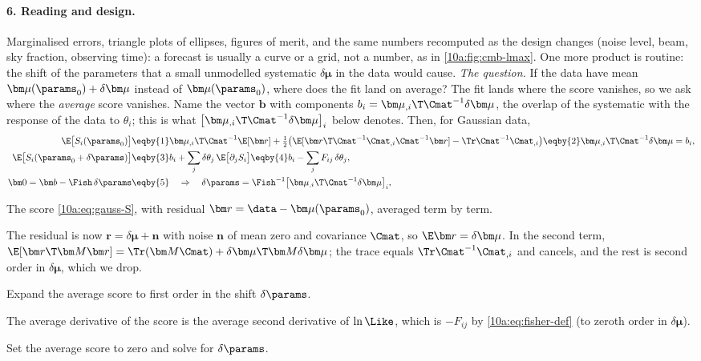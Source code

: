 \paragraph{6. Reading and design.} Marginalised errors, triangle plots of ellipses, figures of merit, and the
same numbers recomputed as the design changes (noise level, beam, sky fraction, observing time): a forecast is
usually a curve or a grid, not a number, as in \cref{10a:fig:cmb-lmax}. One more product is routine: the shift of
the parameters that a small unmodelled systematic $\delta\bm\mu$ in the data would cause. \emph{The question.} If the data
have mean $\bm\mu(\params_0)+\delta\bm\mu$ instead of $\bm\mu(\params_0)$, where does the fit land on average? The fit lands
where the score vanishes, so we ask where the \emph{average} score vanishes. Name the vector $\bm b$ with components
$b_i=\bm\mu_{,i}\T\Cmat^{-1}\delta\bm\mu$, the overlap of the systematic with the response of the data to $\theta_i$; this is
what $\bigl[\bm\mu_{,i}\T\Cmat^{-1}\delta\bm\mu\bigr]_i$ below denotes. Then, for Gaussian data,
\begin{align}
  \E\bigl[S_i(\params_0)\bigr]
  &\eqby{1}\bm\mu_{,i}\T\Cmat^{-1}\E[\bm r]
   +\tfrac12\bigl(\E[\bm r\T\Cmat^{-1}\Cmat_{,i}\Cmat^{-1}\bm r]-\Tr\Cmat^{-1}\Cmat_{,i}\bigr)
   \eqby{2}\bm\mu_{,i}\T\Cmat^{-1}\delta\bm\mu=b_i ,
  \nonumber\\
  \E\bigl[S_i(\params_0+\delta\params)\bigr]
  &\eqby{3}b_i+\sum_j\delta\theta_j\,\E\bigl[\partial_jS_i\bigr]
   \eqby{4}b_i-\sum_jF_{ij}\,\delta\theta_j ,
  \nonumber\\
  \bm0=\bm b-\Fish\,\delta\params
  &\eqby{5}\quad\Rightarrow\quad
  \delta\params=\Fish^{-1}\bigl[\bm\mu_{,i}\T\Cmat^{-1}\delta\bm\mu\bigr]_i ,
  \label{10a:eq:fisher-bias}
\end{align}
\begin{explain}
  \item The score \eqref{10a:eq:gauss-S}, with residual $\bm r=\data-\bm\mu(\params_0)$, averaged term by term.
  \item The residual is now $\bm r=\delta\bm\mu+\bm n$ with noise $\bm n$ of mean zero and covariance $\Cmat$, so $\E\bm r=\delta\bm\mu$. In the
        second term, $\E[\bm r\T\bm M\bm r]=\Tr(\bm M\Cmat)+\delta\bm\mu\T\bm M\delta\bm\mu$; the trace equals $\Tr\Cmat^{-1}\Cmat_{,i}$ and cancels, and
        the rest is second order in $\delta\bm\mu$, which we drop.
  \item Expand the average score to first order in the shift $\delta\params$.
  \item The average derivative of the score is the average second derivative of $\ln\Like$, which is $-F_{ij}$ by
        \eqref{10a:eq:fisher-def} (to zeroth order in $\delta\bm\mu$).
  \item Set the average score to zero and solve for $\delta\params$.
\end{explain}
